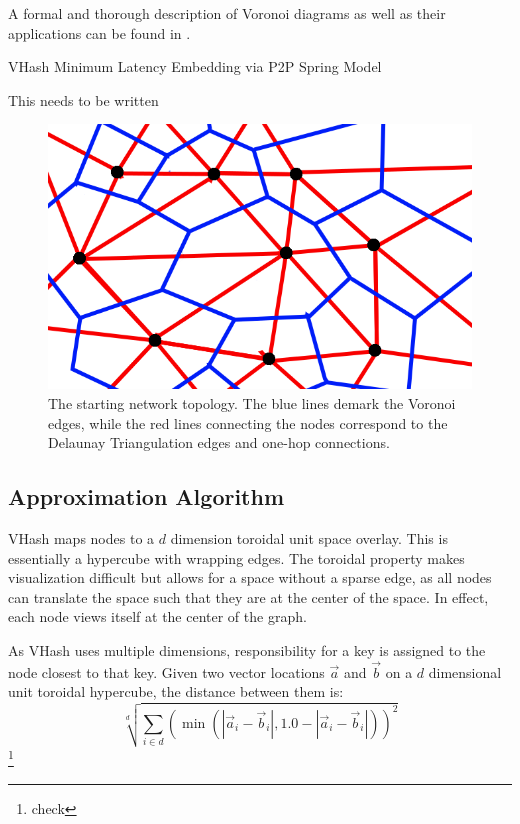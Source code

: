 \documentclass{IEEEtran}
\begin{document}
A formal and thorough description of Voronoi diagrams as well as their applications can be found in \cite{aurenhammer1991voronoi}.





\begin{algorithm}
\caption{VHash Minimum Latency Embedding via P2P Spring Model}
\label{latency}
\begin{algorithmic}[1]  %
	\STATE This needs to be written
\end{algorithmic}
\end{algorithm}



\begin{figure}
    \includegraphics[width=\linewidth]{voronoi-churn2}
    \caption{The starting network topology.  The blue lines demark the Voronoi edges, while the red lines connecting the nodes correspond to the Delaunay Triangulation edges and one-hop connections.}
    \label{churninit}
\end{figure}

\subsection{Approximation Algorithm}
VHash maps nodes to a $d$ dimension toroidal unit space overlay. This is essentially a hypercube with wrapping edges. The toroidal property makes visualization difficult but allows for a space without a sparse edge, as all nodes can translate the space such that they are at the center of the space.  In effect, each node views itself at the center of the graph.

As VHash uses multiple dimensions, responsibility for a key is assigned to the node closest to that key. Given two vector locations $\vec{a}$ and $\vec{b}$ on a  $d$ dimensional unit toroidal hypercube, the distance between them is:
\[  \sqrt[d]{\sum\limits_{i\in d} (\min(|\vec{a}_i-\vec{b}_i|, 1.0-|\vec{a}_i-\vec{b}_i|))^2}\]\footnote{check}
\end{document}
